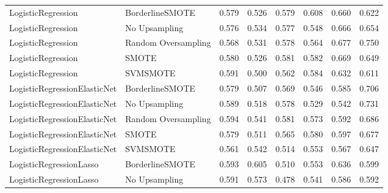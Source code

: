 \begin{tabular}{llllllll}
          LogisticRegression &     BorderlineSMOTE & 0.579 &                     0.526 &                 0.579 &                  0.608 &                                   0.660 &     0.622 \\
          LogisticRegression &       No Upsampling & 0.576 &                     0.534 &                 0.577 &                  0.548 &                                   0.666 &     0.654 \\
          LogisticRegression & Random Oversampling & 0.568 &                     0.531 &                 0.578 &                  0.564 &                                   0.677 &     0.750 \\
          LogisticRegression &               SMOTE & 0.580 &                     0.526 &                 0.581 &                  0.582 &                                   0.669 &     0.649 \\
          LogisticRegression &            SVMSMOTE & 0.591 &                     0.500 &                 0.562 &                  0.584 &                                   0.632 &     0.611 \\
LogisticRegressionElasticNet &     BorderlineSMOTE & 0.579 &                     0.507 &                 0.569 &                  0.546 &                                   0.585 &     0.706 \\
LogisticRegressionElasticNet &       No Upsampling & 0.589 &                     0.518 &                 0.578 &                  0.529 &                                   0.542 &     0.731 \\
LogisticRegressionElasticNet & Random Oversampling & 0.594 &                     0.541 &                 0.581 &                  0.573 &                                   0.592 &     0.686 \\
LogisticRegressionElasticNet &               SMOTE & 0.579 &                     0.511 &                 0.565 &                  0.580 &                                   0.597 &     0.677 \\
LogisticRegressionElasticNet &            SVMSMOTE & 0.561 &                     0.542 &                 0.514 &                  0.553 &                                   0.567 &     0.647 \\
     LogisticRegressionLasso &     BorderlineSMOTE & 0.593 &                     0.605 &                 0.510 &                  0.553 &                                   0.636 &     0.599 \\
     LogisticRegressionLasso &       No Upsampling & 0.591 &                     0.573 &                 0.478 &                  0.541 &                                   0.586 &     0.592 \\

\end{tabular}
